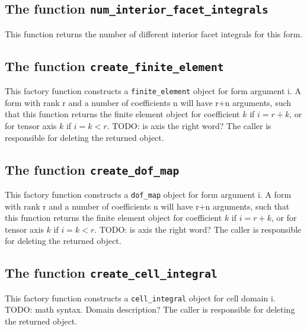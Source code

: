 \subsection{The function \texttt{num\_interior\_facet\_integrals}}
This function returns the number of different interior facet integrals for this form.



\subsection{The function \texttt{create\_finite\_element}}
This factory function constructs a \texttt{finite\_element} object for form argument i.
A form with rank r and a number of coefficients n will have r+n arguments,
such that this function returns the finite element object for coefficient $k$ if $i=r+k$,
or for tensor axis $k$ if $i=k<r$. TODO: is axis the right word?
The caller is responsible for deleting the returned object.



\subsection{The function \texttt{create\_dof\_map}}
This factory function constructs a \texttt{dof\_map} object for form argument i.
A form with rank r and a number of coefficients n will have r+n arguments,
such that this function returns the finite element object for coefficient $k$ if $i=r+k$,
or for tensor axis $k$ if $i=k<r$. TODO: is axis the right word?
The caller is responsible for deleting the returned object.



\subsection{The function \texttt{create\_cell\_integral}}
This factory function constructs a \texttt{cell\_integral} object for cell domain i.
TODO: math syntax. Domain description?
The caller is responsible for deleting the returned object.




